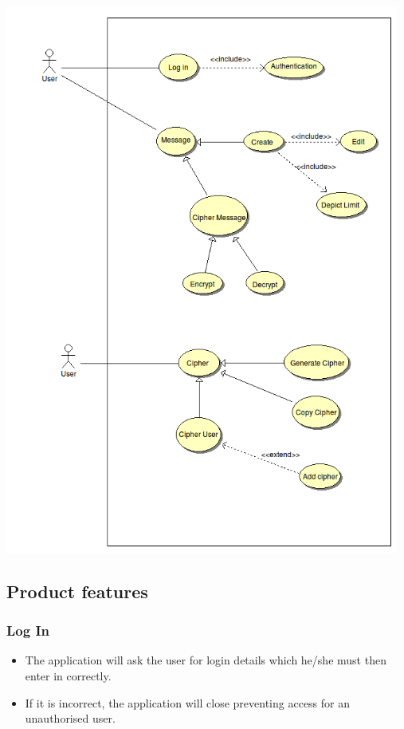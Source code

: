 \begin{center}
 \includegraphics[width=13cm]{diagrams/UseCaseDiagrams/UseCaseSMSEncryption.png}
\end{center}




\subsection{Product features}
\subsubsection{Log In}
\begin{itemize}
\item The application will ask the user for login details which he/she must then enter in correctly. 
\item If it is incorrect, the application will close preventing access for an unauthorised user.
\end{itemize}
